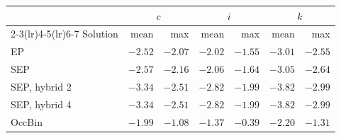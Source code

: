 \begin{tabular}{lrrrrrr}
\toprule
& \multicolumn{2}{c}{$c$} & \multicolumn{2}{c}{$i$} & \multicolumn{2}{c}{$k$} \\ \cmidrule(lr){2-3}\cmidrule(lr){4-5}\cmidrule(lr){6-7} Solution & mean & max & mean & max & mean & max \\
\midrule
EP & $-2.52$ & $-2.07$ & $-2.02$ & $-1.55$ & $-3.01$ & $-2.55$ \\
SEP & $-2.57$ & $-2.16$ & $-2.06$ & $-1.64$ & $-3.05$ & $-2.64$ \\
SEP, hybrid 2 & $-3.34$ & $-2.51$ & $-2.82$ & $-1.99$ & $-3.82$ & $-2.99$ \\
SEP, hybrid 4 & $-3.34$ & $-2.51$ & $-2.82$ & $-1.99$ & $-3.82$ & $-2.99$ \\
OccBin & $-1.99$ & $-1.08$ & $-1.37$ & $-0.39$ & $-2.20$ & $-1.31$ \\
\bottomrule
\end{tabular}
